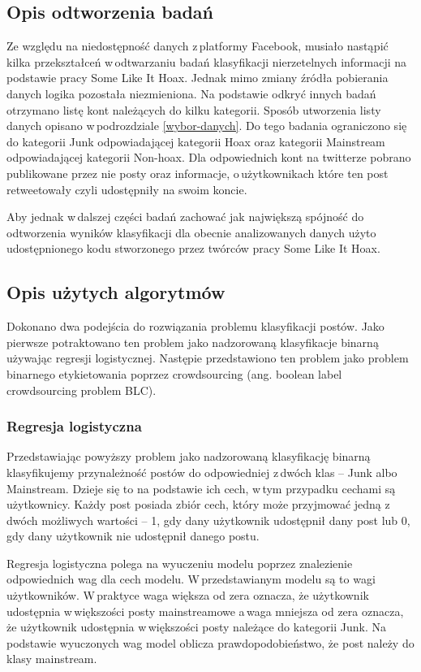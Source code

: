 \subsection{Opis odtworzenia badań }
Ze względu na niedostępność danych z\,platformy Facebook, musiało nastąpić kilka przekształceń w\,odtwarzaniu badań klasyfikacji nierzetelnych informacji na podstawie pracy Some Like It Hoax. Jednak mimo zmiany źródła pobierania danych logika pozostała niezmieniona. Na podstawie odkryć innych badań otrzymano listę kont należących do kilku kategorii. Sposób utworzenia listy danych opisano w\,podrozdziale \ref{wybor-danych}. Do tego badania ograniczono się do kategorii Junk odpowiadającej kategorii Hoax oraz kategorii Mainstream odpowiadającej kategorii Non-hoax. Dla odpowiednich kont na twitterze pobrano publikowane przez nie posty oraz informacje, o\,użytkownikach które ten post retweetowały czyli udostępniły na swoim koncie. 
\par
Aby jednak w\,dalszej części badań zachować jak największą spójność do odtworzenia wyników klasyfikacji dla obecnie analizowanych danych użyto udostępnionego kodu stworzonego przez twórców pracy Some Like It Hoax. 

\subsection{Opis użytych algorytmów } \label{klasyfikacja-algorytmy}
Dokonano dwa podejścia do rozwiązania problemu klasyfikacji postów. Jako pierwsze potraktowano ten problem jako nadzorowaną klasyfikacje binarną używając regresji logistycznej. Następie przedstawiono ten problem jako problem binarnego etykietowania poprzez crowdsourcing (ang. boolean label crowdsourcing problem BLC). 
\subsubsection{Regresja logistyczna}
Przedstawiając powyższy problem jako nadzorowaną klasyfikację binarną klasyfikujemy przynależność postów do odpowiedniej z\,dwóch klas – Junk albo Mainstream. Dzieje się to na podstawie ich cech, w\,tym przypadku cechami są użytkownicy. Każdy post posiada zbiór cech, który może przyjmować jedną z\,dwóch możliwych wartości – 1, gdy dany użytkownik udostępnił dany post lub 0, gdy dany użytkownik nie udostępnił danego postu.
\par
Regresja logistyczna polega na wyuczeniu modelu poprzez znalezienie odpowiednich wag dla cech modelu.  W\,przedstawianym modelu są to wagi użytkowników. W\,praktyce waga większa od zera oznacza, że użytkownik udostępnia w\,większości posty mainstreamowe a\,waga mniejsza od zera oznacza, że użytkownik udostępnia w\,większości posty należące do kategorii Junk. Na podstawie wyuczonych wag model oblicza prawdopodobieństwo, że post należy do klasy mainstream.

